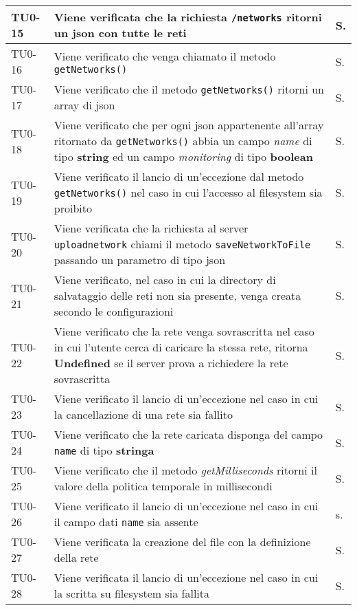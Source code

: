 \begin{longtable}{|C{.15\textwidth}|m{.66\textwidth}|C{.10\textwidth}|}
\hline 
{}TU0-15 & Viene verificata che la richiesta \texttt{/networks} ritorni un json con tutte le reti & S. \\ 
\hline 
TU0-16 & Viene verificato che venga chiamato il metodo \texttt{getNetworks()} & S. \\
\hline 
{}TU0-17 & Viene verificato che il metodo \texttt{getNetworks()} ritorni un array di json & S. \\ 
\hline
TU0-18 & Viene verificato che per ogni json appartenente all'array ritornato da \texttt{getNetworks()} abbia un campo \textit{name} di tipo \textbf{string} ed un campo \textit{monitoring} di tipo \textbf{boolean} & S. \\ 
\hline
{}TU0-19 & Viene verificato il lancio di un'eccezione dal metodo \texttt{getNetworks()} nel caso in cui l'accesso al filesystem sia proibito & S. \\ 
\hline 
TU0-20 & Viene verificata che la richiesta al server \texttt{uploadnetwork} chiami il metodo \texttt{saveNetworkToFile} passando un parametro di tipo json & S. \\ 
\hline 
{}TU0-21 & Viene verificato, nel caso in cui la directory di salvataggio delle reti non sia presente, venga creata secondo le configurazioni & S. \\ 
\hline 
TU0-22 & Viene verificato che la rete venga sovrascritta nel caso in cui l'utente cerca di caricare la stessa rete, ritorna \textbf{Undefined} se il server prova a richiedere la rete sovrascritta & S. \\
\hline
{}TU0-23 & Viene verificato il lancio di un'eccezione nel caso in cui la cancellazione di una rete sia fallito & S. \\ 
\hline
TU0-24 & Viene verificato che la rete caricata disponga del campo \texttt{name} di tipo \textbf{stringa} & S. \\ 
\hline
{}TU0-25 & Viene verificato che il metodo \textit{getMilliseconds} ritorni il valore della politica temporale in millisecondi & S.\\
\hline 
 TU0-26 & Viene verificato il lancio di un'eccezione nel caso in cui il campo dati \texttt{name} sia assente & s. \\ 
\hline 
{}TU0-27	 & Viene verificata la creazione del file con la definizione della rete & S. \\ 
\hline 
 TU0-28 & Viene verificata il lancio di un'eccezione nel caso in cui la scritta su filesystem sia fallita & S. \\ 

\end{longtable}
